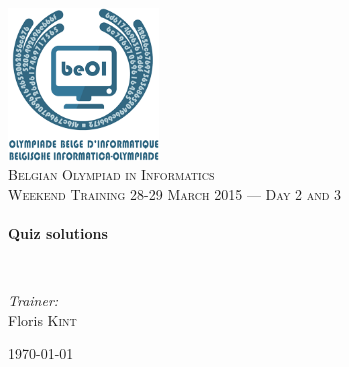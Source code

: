 \begin{titlepage}
\begin{center}

\includegraphics[width=0.3\textwidth]{./img/beoi-logo}~\\[1cm]

\textsc{\LARGE Belgian Olympiad in Informatics}\\[1.5cm]

\textsc{\Large Weekend Training 28-29 March 2015 --- Day 2 and 3}\\[0.5cm]

\HRule \\[0.4cm]
{ \huge \bfseries Quiz solutions \\[0.4cm] }

\HRule \\[1.5cm]

\begin{center} \large
\emph{Trainer:}\\
Floris \textsc{Kint}\\
\end{center}

\vfill

{\large \today}

\end{center}
\end{titlepage}